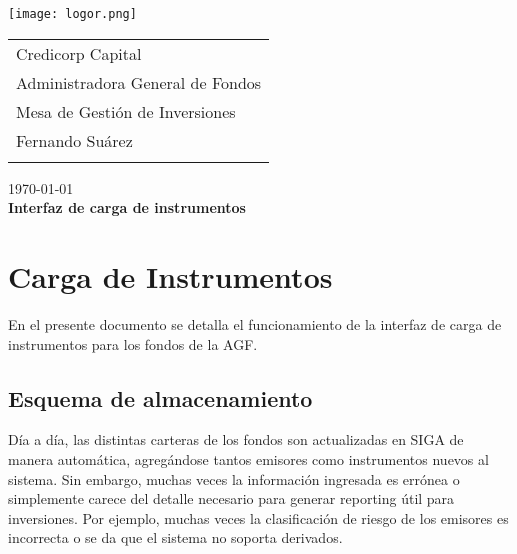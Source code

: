 \documentclass{article}
\begin{document}
\texttt{[image: logor.png]}
\vspace*{-1.55cm}

\hspace*{1.4 cm}
 \hspace*{2.9 cm}
 {\footnotesize
 \begin{tabular}{l}
  \sc Credicorp Capital\\
  \sc Administradora General de Fondos \\
  \sc Mesa de Gestión de Inversiones  \\
  \sc Fernando Suárez  \\
  \vspace{15\baselineskip}\mbox{}
  \vspace{-3mm}\mbox{}
 \end{tabular}
}

 \bigskip

\vspace*{5mm}
\begin{center}
{\today} \\
\vspace{3mm}
{\Large\bf Interfaz de carga de instrumentos} \\
\vspace{2mm}
\end{center}
\section{Carga de Instrumentos}


En el presente documento se detalla el funcionamiento de la interfaz de carga de instrumentos para los fondos de la AGF.


\subsection{Esquema de almacenamiento}


\par Día a día, las distintas carteras de los fondos son actualizadas en SIGA de manera automática, agregándose tantos emisores como instrumentos nuevos al sistema. Sin embargo, muchas veces la información ingresada es errónea o simplemente carece del detalle necesario para generar reporting útil para inversiones. Por ejemplo, muchas veces la clasificación de riesgo de los emisores es incorrecta o se da que el sistema no soporta derivados. 
\end{document}
